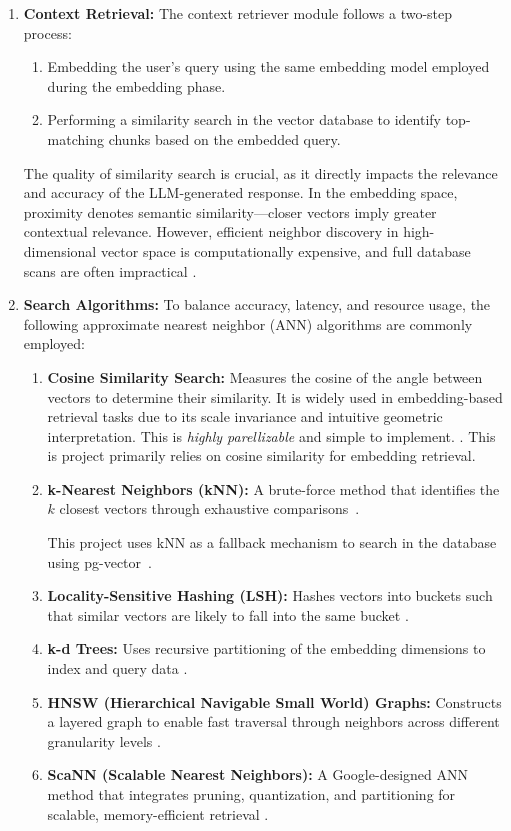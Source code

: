 \begin{enumerate}[label=\alph*.]
  \item \textbf{Context Retrieval:} The context retriever module follows a two-step process:
  \begin{enumerate}
    \item Embedding the user's query using the same embedding model employed during the embedding phase.
    \item Performing a similarity search in the vector database to identify top-matching chunks based on the embedded query.
  \end{enumerate}

  The quality of similarity search is crucial, as it directly impacts the relevance and accuracy of the LLM-generated response. In the embedding space, proximity denotes semantic similarity—closer vectors imply greater contextual relevance. However, efficient neighbor discovery in high-dimensional vector space is computationally expensive, and full database scans are often impractical \cite{sugawara2016approxsearch}.

  \item \textbf{Search Algorithms:} To balance accuracy, latency, and resource usage, the following approximate nearest neighbor (ANN) algorithms are commonly employed:
  \begin{enumerate}
    \item \textbf{Cosine Similarity Search:} Measures the cosine of the angle between vectors to determine their similarity. It is widely used in embedding-based retrieval tasks due to its scale invariance and intuitive geometric interpretation. This is \textit{highly parellizable} and simple to implement. \cite{steck2024cosine}. 
    This is project primarily relies on cosine similarity for embedding retrieval.
    
    \item \textbf{k-Nearest Neighbors (kNN):} A brute-force method that identifies the $k$ closest vectors through exhaustive comparisons~\cite{labelbox2023vectorsimilarity}.
    
    This project uses kNN as a fallback mechanism to search in the database using pg-vector~\cite{pgvector}. 
    
    
    \item \textbf{Locality-Sensitive Hashing (LSH):} Hashes vectors into buckets such that similar vectors are likely to fall into the same bucket \cite{labelbox2023vectorsimilarity}.
    \item \textbf{k-d Trees:} Uses recursive partitioning of the embedding dimensions to index and query data \cite{labelbox2023vectorsimilarity}.
    \item \textbf{HNSW (Hierarchical Navigable Small World) Graphs:} Constructs a layered graph to enable fast traversal through neighbors across different granularity levels \cite{labelbox2023vectorsimilarity}.
    \item \textbf{ScaNN (Scalable Nearest Neighbors):} A Google-designed ANN method that integrates pruning, quantization, and partitioning for scalable, memory-efficient retrieval \cite{guo2020accelerating}.
  \end{enumerate}


\end{enumerate}
